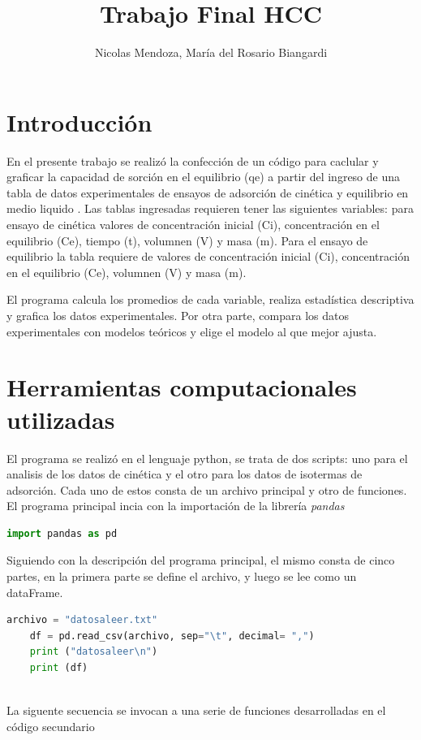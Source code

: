 \documentclass[]{article}
\title{Trabajo Final HCC}
\author{Nicolas Mendoza,  
María del Rosario Biangardi}
\begin{document}
\maketitle


\section{Introducción}
{\small {\normalsize En el presente trabajo se realizó la confección de un código para caclular y graficar la capacidad de sorción en el equilibrio (qe) a partir del ingreso de una tabla de datos experimentales de ensayos de adsorción de cinética y equilibrio en medio liquido . Las tablas ingresadas requieren tener las siguientes variables: para ensayo de cinética valores de concentración inicial (Ci), concentración en el equilibrio (Ce), tiempo (t), volumnen (V) y masa (m). Para el ensayo de equilibrio la tabla requiere de valores de concentración inicial (Ci), concentración en el equilibrio (Ce), volumnen (V) y masa (m).
		
		El programa calcula los promedios de cada variable, realiza estadística descriptiva y grafica los datos experimentales. Por otra parte, compara los datos experimentales con modelos teóricos y elige el modelo al que mejor ajusta.  
		 }}
\section{Herramientas computacionales utilizadas}
El programa se realizó en el lenguaje python, se trata de dos scripts:
 uno para el analisis de los datos de cinética y el otro para los datos de isotermas de adsorción. Cada uno de estos consta de un archivo principal y otro de funciones. El programa principal incia con la importación de la librería \textit{pandas}
\begin{lstlisting}[language=Python,style=mystyle]
 import pandas as pd
 \end{lstlisting}
 
 Siguiendo con la descripción del programa principal, el mismo consta de cinco partes, en la primera parte se define el archivo, y luego se lee como un dataFrame.
 \begin{lstlisting}[language=Python,style=mystyle]
 	archivo = "datosaleer.txt"
 	df = pd.read_csv(archivo, sep="\t", decimal= ",")
 	print ("datosaleer\n")
 	print (df)
 		
 \end{lstlisting}
 
  La siguente secuencia se invocan a una serie de funciones desarrolladas en el código secundario
  
\end{document}
